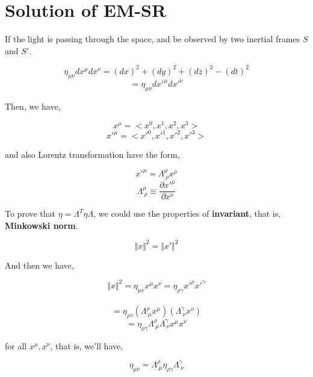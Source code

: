 \documentclass[12pt]{article}
\begin{document}
\begin{center}
    
\end{center}

\section{Solution of EM-SR}

If the light is passing through the space, and be observed by two inertial frames $S$ and $S'$. 

\begin{center}
    \[ \eta_{\mu \nu}dx^{\mu}dx^{\nu} = (dx)^2 + (dy)^2 + (dz)^2 - (dt)^2 \]
    \[ = \eta_{\mu \nu}dx'^{\mu}dx'^{\nu} \]
\end{center}

Then, we have,

\begin{center}
    \[ x^{\mu} = <x^0, x^1, x^2, x^3> \]
    \[ x'^{\mu} = <x'^0, x'^1, x'^2, x'^3> \]
\end{center}

and also Lorentz transformation have the form,

\begin{center}
    \[ x'^{\mu} = \Lambda^{\mu}_{\ \rho} x^{\rho} \]
    \[ \Lambda^{\mu}_{\ \rho} \equiv \frac{\partial x'^{\mu}}{\partial x^{\nu}} \]
\end{center}

To prove that $\eta = \Lambda^T \eta \Lambda$, we could use the properties of \textbf{invariant}, that is, \textbf{Minkowski norm}. 

\begin{center}
    \[ \Vert x \Vert ^2 = \Vert x' \Vert ^2 \]
\end{center}

And then we have,

\begin{center}
    \[ \Vert x \Vert ^2 = \eta_{\mu \nu} x^{\mu}x^{\nu} = \eta_{\rho \gamma}x'^{\rho}x'^{\gamma} \]\\
    \[ = \eta_{\rho \gamma}(\Lambda^{\rho}_{\ \mu}x^{\mu})(\Lambda^{\gamma}_{\ \nu}x^{\nu}) \]
    \[ = \eta_{\rho\gamma}\Lambda^{\rho}_{\ \mu}\Lambda^{\gamma}_{\ \nu}x^{\mu}x^{\nu} \]
\end{center}

for all $x^{\mu}, x^{\nu}$, that is, we'll have,

\begin{center}
    \[ \eta_{\mu \nu} = \Lambda^{\rho}_{\ \mu} \eta_{\rho\gamma} \Lambda^{\gamma}_{\ \nu} \]
\end{center}
\end{document}
